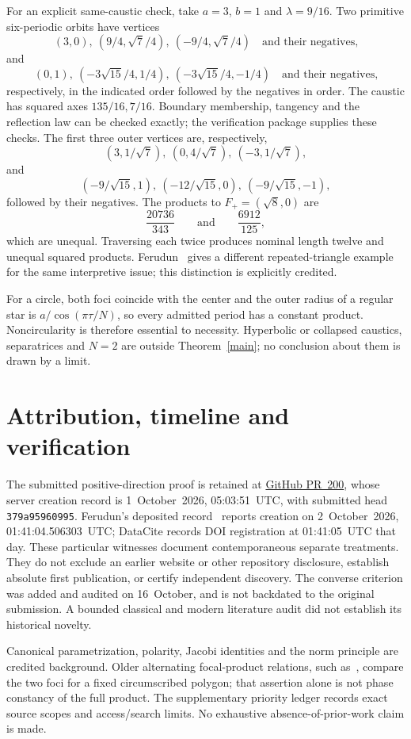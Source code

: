 \documentclass[11pt]{article}
\begin{document}
For an explicit same-caustic check, take $a=3$, $b=1$ and
$\lambda=9/16$. Two primitive six-periodic orbits have vertices
\[
 (3,0),\ (9/4,\sqrt7/4),\ (-9/4,\sqrt7/4)
 \quad\text{and their negatives,}
\]
and
\[
 (0,1),\ (-3\sqrt{15}/4,1/4),\ (-3\sqrt{15}/4,-1/4)
 \quad\text{and their negatives,}
\]
respectively, in the indicated order followed by the negatives in order.
The caustic has squared axes $135/16,7/16$.
Boundary membership, tangency and the reflection law can be checked
exactly; the verification package supplies these checks.
The first three outer vertices are, respectively,
\[
 (3,1/\sqrt7),\ (0,4/\sqrt7),\ (-3,1/\sqrt7),
\]
and
\[
 (-9/\sqrt{15},1),\ (-12/\sqrt{15},0),\ (-9/\sqrt{15},-1),
\]
followed by their negatives. The products to $F_+=(\sqrt8,0)$ are
\[
 \frac{20736}{343}\qquad\text{and}\qquad\frac{6912}{125},
\]
which are unequal. Traversing each twice produces nominal length
twelve and unequal squared products. Ferudun~\cite[Section~5]{Ferudun}
gives a different repeated-triangle example for the same interpretive
issue; this distinction is explicitly credited.

For a circle, both foci coincide with the center and the outer radius
of a regular star is $a/\cos(\pi\tau/N)$, so every admitted period has
a constant product. Noncircularity is therefore essential to necessity.
Hyperbolic or collapsed caustics, separatrices and $N=2$ are outside
Theorem~\ref{main}; no conclusion about them is drawn by a limit.

\section{Attribution, timeline and verification}\label{credit}
The submitted positive-direction proof is retained at
\href{https://github.com/AlecKriebel/Math/pull/200}{GitHub PR~200},
whose server creation record is 1~October~2026, 05:03:51~UTC, with
submitted head \texttt{379a95960995}.
Ferudun's deposited record~\cite{Ferudun} reports creation on
2~October~2026, 01:41:04.506303~UTC; DataCite records DOI registration
at 01:41:05~UTC that day. These particular witnesses document
contemporaneous separate treatments. They do not exclude an earlier
website or other repository disclosure, establish absolute first
publication, or certify independent discovery. The converse criterion
was added and audited on 16~October, and is not backdated to the original
submission. A bounded classical and modern literature audit did not
establish its historical novelty.

Canonical parametrization, polarity, Jacobi identities and the norm
principle are credited background. Older alternating focal-product
relations, such as~\cite[Section~2, p.~219]{Anonymous}, compare the two
foci for a fixed circumscribed polygon; that assertion alone is not
phase constancy of the full product. The supplementary priority ledger
records exact source scopes and access/search limits. No exhaustive
absence-of-prior-work claim is made.
\end{document}
